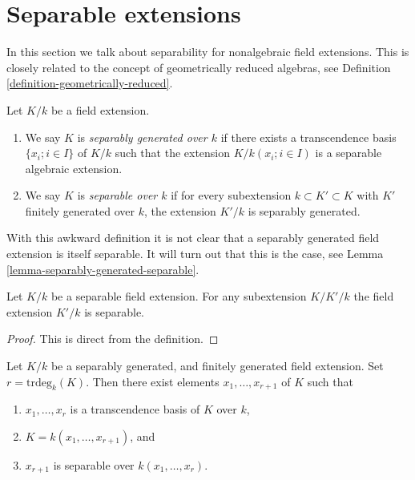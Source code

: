 \section{Separable extensions}
\label{section-separability}

\noindent
In this section we talk about separability for nonalgebraic field extensions.
This is closely related to the concept of geometrically reduced algebras, see
Definition \ref{definition-geometrically-reduced}.

\begin{definition}
\label{definition-separable-field-extension}
Let $K/k$ be a field extension.
\begin{enumerate}
\item We say $K$ is {\it separably generated over $k$} if there exists
a transcendence basis $\{x_i; i \in I\}$ of $K/k$ such that the extension
$K/k(x_i; i \in I)$ is a separable algebraic extension.
\item We say $K$ is {\it separable over $k$} if for every subextension
$k \subset K' \subset K$ with $K'$ finitely generated
over $k$, the extension $K'/k$ is separably generated.
\end{enumerate}
\end{definition}

\noindent
With this awkward definition it is not clear that
a separably generated field extension is itself separable.
It will turn out that this is the case, see
Lemma \ref{lemma-separably-generated-separable}.

\begin{lemma}
\label{lemma-subextensions-are-separable}
Let $K/k$ be a separable field extension.
For any subextension $K/K'/k$ the field
extension $K'/k$ is separable.
\end{lemma}

\begin{proof}
This is direct from the definition.
\end{proof}

\begin{lemma}
\label{lemma-generating-finitely-generated-separable-field-extensions}
Let $K/k$ be a separably generated, and finitely generated
field extension.
Set $r = \text{trdeg}_k(K)$. Then there exist elements
$x_1, \ldots, x_{r + 1}$ of $K$ such that
\begin{enumerate}
\item $x_1, \ldots, x_r$ is a transcendence basis of $K$ over $k$,
\item $K = k(x_1, \ldots, x_{r + 1})$, and
\item $x_{r + 1}$ is separable over $k(x_1, \ldots, x_r)$.
\end{enumerate}
\end{lemma}

